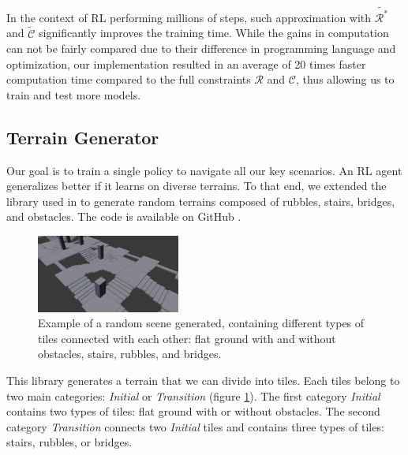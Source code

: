 In the context of RL performing millions of steps, such approximation with $\tilde{\mathcal{R}^*}$ and $\tilde{\mathcal{C}}$ significantly improves the training time. 
While the gains in computation can not be fairly compared due to their difference in programming language and optimization, our implementation resulted in an average of 20 times faster computation time compared to the full constraints $\mathcal{R}$ and $\mathcal{C}$, thus allowing us to train and test more models.


\subsection{Terrain Generator\label{subsub:terrain_generator}}
Our goal is to train a single policy to navigate all our key scenarios. 
An RL agent generalizes better if it learns on diverse terrains. 
To that end, we extended the library used in \cite{sl1m_v2} to generate random terrains composed of rubbles, stairs, bridges, and obstacles. The code is available on GitHub \cite{random_scene_gen}.

\begin{figure}
    \centering
    \includegraphics[width=0.42\textwidth]{Figures/Chapter_LEAS/random_scene_tiles_example.png}
    \caption{Example of a random scene generated, containing different types of tiles connected with each other: flat ground with and without obstacles, stairs, rubbles, and bridges.}
    \label{fig:random_scene_gene_tiles_example}
\end{figure}

This library generates a terrain that we can divide into tiles. 
Each tiles belong to two main categories: \textit{Initial} or \textit{Transition} (figure \ref{fig:random_scene_gene_tiles_example}). 
The first category \textit{Initial} contains two types of tiles: flat ground with or without obstacles. 
The second category \textit{Transition} connects two \textit{Initial} tiles and contains three types of tiles: stairs, rubbles, or bridges.


